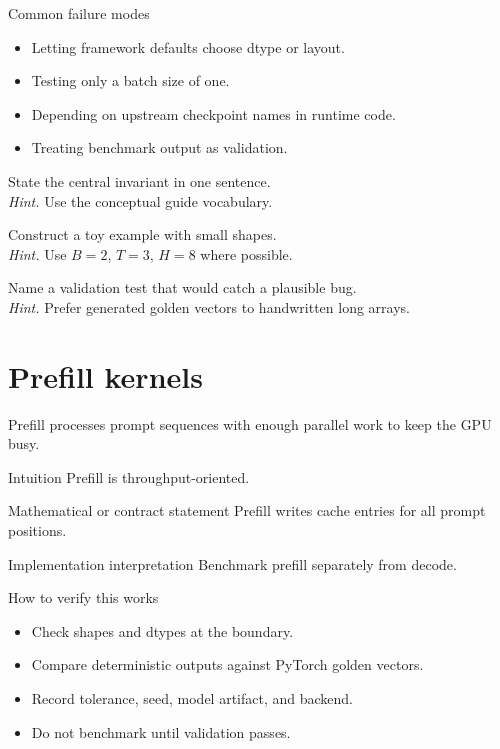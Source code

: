 \begin{warningbox}{Common failure modes}
\begin{itemize}
\item Letting framework defaults choose dtype or layout.
\item Testing only a batch size of one.
\item Depending on upstream checkpoint names in runtime code.
\item Treating benchmark output as validation.
\end{itemize}
\end{warningbox}

\begin{chapterexercises}
\item State the central invariant in one sentence.\\
\textit{Hint.} Use the conceptual guide vocabulary.
\item Construct a toy example with small shapes.\\
\textit{Hint.} Use $B=2$, $T=3$, $H=8$ where possible.
\item Name a validation test that would catch a plausible bug.\\
\textit{Hint.} Prefer generated golden vectors to handwritten long arrays.
\end{chapterexercises}

\chapter{Prefill kernels}
\label{ch:prefill-kernels}
Prefill processes prompt sequences with enough parallel work to keep the GPU busy.



\begin{intuitionbox}{Intuition}
Prefill is throughput-oriented.
\end{intuitionbox}

\begin{definitionbox}{Mathematical or contract statement}
Prefill writes cache entries for all prompt positions.
\end{definitionbox}

\begin{implementationbox}{Implementation interpretation}
Benchmark prefill separately from decode.
\end{implementationbox}

\begin{verificationbox}{How to verify this works}
\begin{itemize}
\item Check shapes and dtypes at the boundary.
\item Compare deterministic outputs against PyTorch golden vectors.
\item Record tolerance, seed, model artifact, and backend.
\item Do not benchmark until validation passes.
\end{itemize}
\end{verificationbox}

